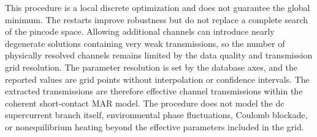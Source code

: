             This procedure is a local discrete optimization and does not guarantee the global minimum. The restarts improve robustness but do not replace a complete search of the pincode space. Allowing additional channels can introduce nearly degenerate solutions containing very weak transmissions, so the number of physically resolved channels remains limited by the data quality and transmission grid resolution. The parameter resolution is set by the database axes, and the reported values are grid points without interpolation or confidence intervals. The extracted transmissions are therefore effective channel transmissions within the coherent short-contact MAR model. The procedure does not model the dc supercurrent branch itself, environmental phase fluctuations, Coulomb blockade, or nonequilibrium heating beyond the effective parameters included in the grid.
